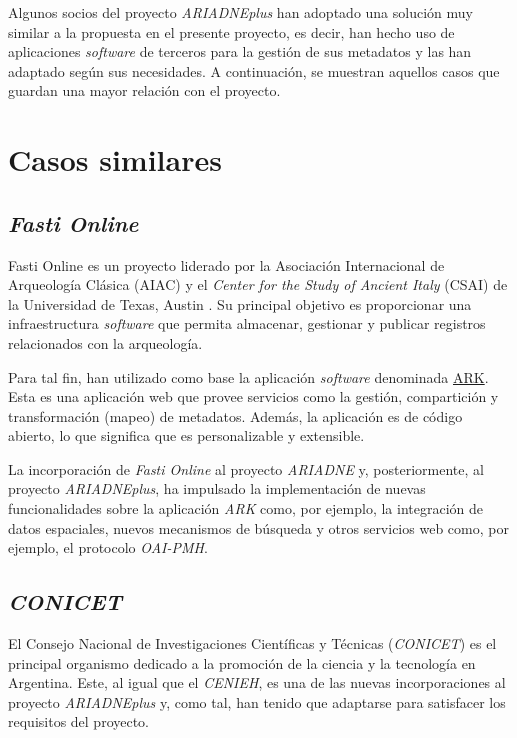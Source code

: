 
Algunos socios del proyecto \emph{ARIADNEplus} han adoptado una solución muy
similar a la propuesta en el presente proyecto, es decir, han hecho uso
de aplicaciones \emph{software} de terceros para la gestión de sus
metadatos y las han adaptado según sus necesidades. A continuación, se
muestran aquellos casos que guardan una mayor relación con el proyecto.

\section{Casos similares}

\subsection{\emph{Fasti Online}}

Fasti Online \cite{fasti:web}
es un proyecto liderado por la Asociación Internacional de Arqueología
Clásica (AIAC) \cite{aiac:web} y el \emph{Center
for the Study of Ancient Italy} (CSAI) \cite{csai:web} de la Universidad
de Texas, Austin \cite{uot:web}. Su principal objetivo es proporcionar
una infraestructura \emph{software} que permita almacenar, gestionar y
publicar registros relacionados con la arqueología.

Para tal fin, han utilizado como base la aplicación \emph{software}
denominada \href{https://ark.lparchaeology.com/}{ARK}. Esta es una
aplicación web que provee servicios como la gestión, compartición y
transformación (mapeo) de metadatos. Además, la aplicación es de
código abierto, lo que significa que es personalizable y extensible.

La incorporación de \emph{Fasti Online} al proyecto \emph{ARIADNE} y,
posteriormente, al proyecto \emph{ARIADNEplus}, ha impulsado la
implementación de nuevas funcionalidades sobre la aplicación \emph{ARK}
como, por ejemplo, la integración de datos espaciales, nuevos mecanismos
de búsqueda y otros servicios web como, por ejemplo, el protocolo
\emph{OAI-PMH}.

\subsection{\emph{CONICET}}

El Consejo Nacional de Investigaciones Científicas y Técnicas \cite{conicet:web} 
(\emph{CONICET}) es el principal organismo dedicado a la promoción de la ciencia y la
tecnología en Argentina. Este, al igual que el \emph{CENIEH}, es una de las
nuevas incorporaciones al proyecto \emph{ARIADNEplus} y, como tal, han
tenido que adaptarse para satisfacer los requisitos del proyecto.

